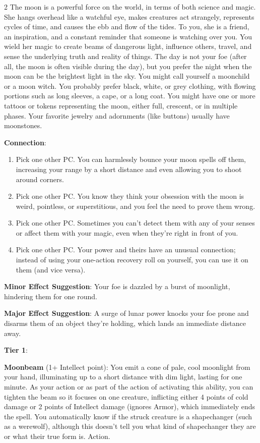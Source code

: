\begin{multicols}{2}
The moon is a powerful force on the world, in terms of both science and magic. She hangs overhead like a watchful eye, makes creatures act strangely, represents cycles of time, and causes the ebb and flow of the tides. To you, she is a friend, an inspiration, and a constant reminder that someone is watching over you. You wield her magic to create beams of dangerous light, influence others, travel, and sense the underlying truth and reality of things. The day is not your foe (after all, the moon is often visible during the day), but you prefer the night when the moon can be the brightest light in the sky. You might call yourself a moonchild or a moon witch. You probably prefer black, white, or grey clothing, with flowing portions such as long sleeves, a cape, or a long coat. You might have one or more tattoos or tokens representing the moon, either full, crescent, or in multiple phases. Your favorite jewelry and adornments (like buttons) usually have moonstones.

\textbf{Connection}:
\begin{enumerate} 
\item Pick one other PC. You can harmlessly bounce your moon spells off them, increasing your range by a short distance and even allowing you to shoot around corners.
\item Pick one other PC. You know they think your obsession with the moon is weird, pointless, or superstitious, and you feel the need to prove them wrong.
\item Pick one other PC. Sometimes you can’t detect them with any of your senses or affect them with your magic, even when they’re right in front of you.
\item Pick one other PC. Your power and theirs have an unusual connection; instead of using your one-action recovery roll on yourself, you can use it on them (and vice versa).
\end{enumerate}

\textbf{Minor Effect Suggestion}: Your foe is dazzled by a burst of moonlight, hindering them for one round.

\textbf{Major Effect Suggestion}: A surge of lunar power knocks your foe prone and disarms them of an object they’re holding, which lands an immediate distance away.

\textbf{Tier 1}:

\textbf{Moonbeam} (1+ Intellect point): You emit a cone of pale, cool moonlight from your hand, illuminating up to a short distance with dim light, lasting for one minute. As your action or as part of the action of activating this ability, you can tighten the beam so it focuses on one creature, inflicting either 4 points of cold damage or 2 points of Intellect damage (ignores Armor), which immediately ends the spell. You automatically know if the struck creature is a shapechanger (such as a  werewolf), although this doesn’t tell you what kind of shapechanger they are or what their true form is. Action.


\end{multicols}
